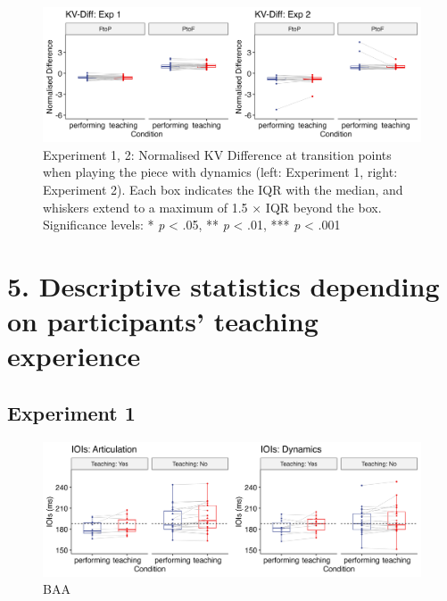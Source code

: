 \documentclass[
  man,floatsintext]{apa6}
\begin{document}
\begin{figure}
\includegraphics[width=1\linewidth]{manuscript_files/figure-latex/plot-vel-diff-2-1} \caption{\label{fig:vel-diff-2}Experiment 1, 2: Normalised KV Difference at transition points when playing the piece with dynamics (left: Experiment 1, right: Experiment 2). Each box indicates the IQR with the median, and whiskers extend to a maximum of 1.5 × IQR beyond the box. Significance levels: * \textit{p} < .05, ** \textit{p} < .01, *** \textit{p} < .001}\label{fig:plot-vel-diff-2}
\end{figure}

\clearpage

\hypertarget{descriptive-statistics-depending-on-participants-teaching-experience}{%
\section{5. Descriptive statistics depending on participants' teaching experience}\label{descriptive-statistics-depending-on-participants-teaching-experience}}

\hypertarget{experiment-1-5}{%
\subsection{Experiment 1}\label{experiment-1-5}}

\begin{figure}
\includegraphics[width=1\linewidth]{manuscript_files/figure-latex/plot-ioi-teaching-1-1} \caption{\label{fig:ioi-teaching-1}BAA}\label{fig:plot-ioi-teaching-1}
\end{figure}
\end{document}
